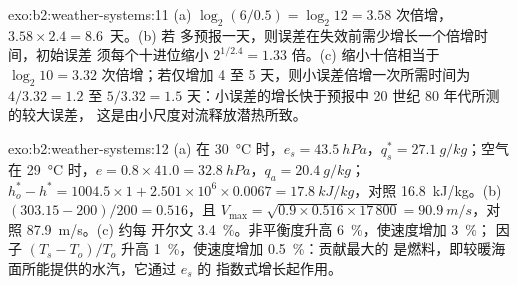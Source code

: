 \begin{solution}{exo:b2:weather-systems:11}
(a) $\log_2(6/0.5) = \log_2 12 = 3.58$ 次倍增，$3.58 \times 2.4 = 8.6$~天。(b) 若
多预报一天，则误差在失效前需少增长一个倍增时间，初始误差
须每个十进位缩小 $2^{1/2.4} = 1.33$ 倍。(c) 缩小十倍相当于
$\log_2 10 = 3.32$ 次倍增；若仅增加 4 至 5 天，则小误差倍增一次所需时间为 $4/3.32 = 1.2$
至 $5/3.32 = 1.5$ 天：小误差的增长快于预报中 20 世纪 80 年代所测的较大误差，
这是由小尺度对流释放潜热所致。
\end{solution}

\begin{solution}{exo:b2:weather-systems:12}
(a) 在 \qty{30}{\celsius} 时，$e_s = \qty{43.5}{hPa}$，$q_s^* = \qty{27.1}{g/kg}$；空气在
\qty{29}{\celsius} 时，$e = 0.8 \times 41.0 = \qty{32.8}{hPa}$，$q_a = \qty{20.4}{g/kg}$；
$h_o^* - h^* = 1004.5 \times 1 + 2.501 \times 10^6 \times 0.0067 = \qty{17.8}{kJ/kg}$，对照
\qty{16.8}{kJ/kg}。(b) $(303.15 - 200)/200 = 0.516$，且 $V_{\max} = \sqrt{0.9 \times 0.516
\times 17\,800} = \qty{90.9}{m/s}$，对照 \qty{87.9}{m/s}。(c) 约每
开尔文 \qty{3.4}{\percent}。非平衡度升高 \qty{6}{\percent}，使速度增加 \qty{3}{\percent}；
因子 $(T_s - T_o)/T_o$ 升高 \qty{1}{\percent}，使速度增加 \qty{0.5}{\percent}：贡献最大的
是燃料，即较暖海面所能提供的水汽，它通过 $e_s$ 的
指数式增长起作用。
\end{solution}

